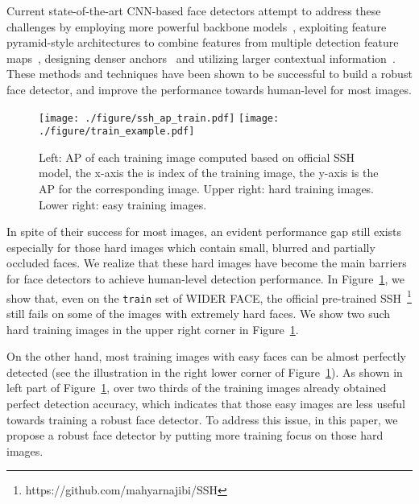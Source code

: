 \documentclass[10pt,twocolumn,letterpaper]{article}
\begin{document}
Current state-of-the-art CNN-based face detectors attempt to address these challenges by employing more powerful backbone models~\cite{BaiFindingTF}, exploiting feature pyramid-style architectures to combine features from multiple detection feature maps~\cite{Tang_2018_ECCV}, designing denser anchors~\cite{zhu2018seeing} and utilizing larger contextual information~\cite{Tang_2018_ECCV}. These methods and techniques have been shown to be successful to build a robust face detector, and improve the performance
towards human-level for most images.

\begin{figure}[!t]
\texttt{[image: ./figure/ssh\_ap\_train.pdf]}\hfill
\texttt{[image: ./figure/train\_example.pdf]}
\caption{Left: AP of each training image computed based on official SSH model, the x-axis
the is index of the training image, the y-axis is the AP for the corresponding image.
Upper right: hard training images. Lower right: easy training images.}
\label{fig:ssh_ap_train}
\end{figure}

In spite of their success for most images, an evident performance gap still exists especially for those hard images which contain small, blurred and partially occluded faces.
We realize that these hard images have become the main barriers for face detectors to achieve human-level detection performance.
In Figure~\ref{fig:ssh_ap_train}, we show that, even on the \texttt{train} set of WIDER
FACE, the official pre-trained SSH~\footnote{https://github.com/mahyarnajibi/SSH} still fails on some of the images with extremely
hard faces.
We show two such hard training images in the upper right corner in
Figure~\ref{fig:ssh_ap_train}.

On the other hand, most training images with easy faces can be almost perfectly detected (see the illustration in the right lower corner of Figure~\ref{fig:ssh_ap_train}).
As shown in left part of Figure~\ref{fig:ssh_ap_train}, over two thirds of the training images already obtained perfect detection accuracy, which indicates that those easy images are less useful towards training a robust face detector. To address this issue, in this paper, we propose a robust face detector by putting more training focus on those hard images.
\end{document}
